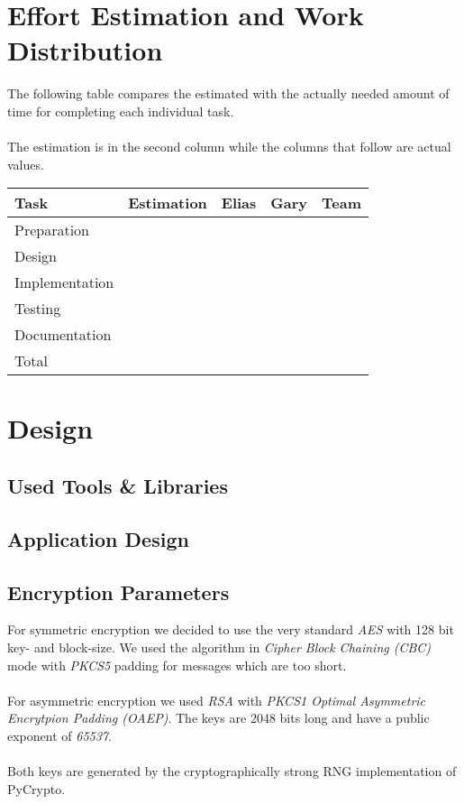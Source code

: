 \documentclass[11pt, a4paper]{article}
\begin{document}
\section{Effort Estimation and Work Distribution}

The following table compares the estimated with the actually needed
amount of time for completing each individual task.
\\\\
The estimation is in the second column while the columns that follow
are actual values.

\parskip 12pt
\begin{tabular} {| l | c | c | c | c |}
	\hline
	Task					&	Estimation		& 	Elias 	& 	Gary 	& 	Team	\\ \hline \hline
	Preparation				&					&			&  			&			\\ \hline
	Design					&					&			&			&			\\ \hline
	Implementation			&					&			&			& 	 		\\ \hline
	Testing					&					&			& 			& 	 		\\ \hline
	Documentation			&					&			&			& 			\\ \hline 
	Total					&					&			&			& 			\\
	\hline
\end{tabular}

\newpage

\section{Design}

\subsection{Used Tools \& Libraries}

\subsection{Application Design}

\subsection{Encryption Parameters}

For symmetric encryption we decided to use the very standard \textit{AES} with
128 bit key- and block-size. We used the algorithm in \textit{Cipher Block
	Chaining (CBC)} mode with \textit{PKCS5} padding for messages which are too
short.
\\\\
For asymmetric encryption we used \textit{RSA} with \textit{PKCS1 Optimal
	Asymmetric Encrytpion Padding (OAEP)}. The keys are 2048 bits long and have a
public exponent of \textit{65537}.
\\\\
Both keys are generated by the cryptographically strong RNG implementation of
PyCrypto.
\end{document}
